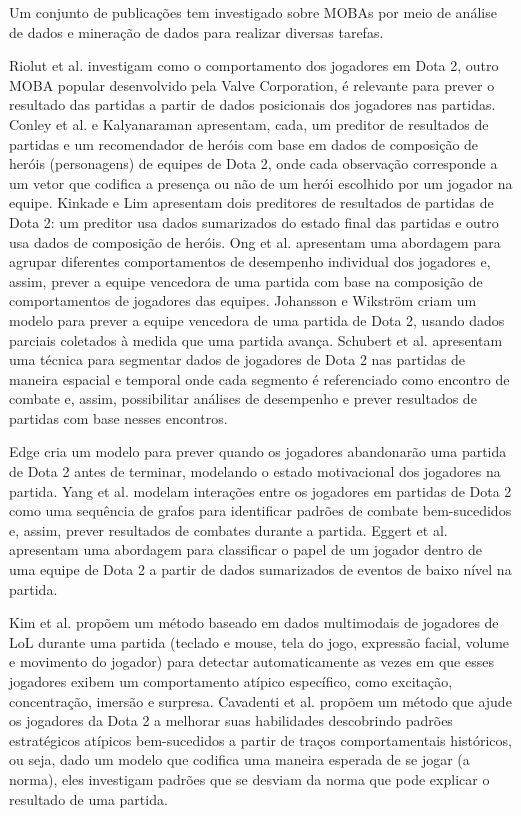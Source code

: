 Um conjunto de publicações tem investigado sobre MOBAs por meio de análise de dados e mineração de dados para realizar diversas tarefas.

Riolut et al. \cite{rioult2014mining} investigam como o comportamento dos jogadores em Dota 2, outro MOBA popular desenvolvido pela Valve Corporation, é relevante para prever o resultado das partidas a partir de dados posicionais dos jogadores nas partidas. Conley et al. \cite{conley2013does} e Kalyanaraman \cite{kalyanaraman2014win} apresentam, cada, um preditor de resultados de partidas e um recomendador de heróis com base em dados de composição de heróis (personagens) de equipes de Dota 2, onde cada observação corresponde a um vetor que codifica a presença ou não de um herói escolhido por um jogador na equipe. Kinkade e Lim \cite{kinkade2015dota} apresentam dois preditores de resultados de partidas de Dota 2: um preditor usa dados sumarizados do estado final das partidas e outro usa dados de composição de heróis. Ong et al. \cite{ong2015player} apresentam uma abordagem para agrupar diferentes comportamentos de desempenho individual dos jogadores e, assim, prever a equipe vencedora de uma partida com base na composição de comportamentos de jogadores das equipes. Johansson e Wikstr\"om \cite {johansson2015result} criam um modelo para prever a equipe vencedora de uma partida de Dota 2, usando dados parciais coletados à medida que uma partida avança. Schubert et al. \cite{schubert2016esports} apresentam uma técnica para segmentar dados de jogadores de Dota 2 nas partidas de maneira espacial e temporal onde cada segmento é referenciado como encontro de combate e, assim, possibilitar análises de desempenho e prever resultados de partidas com base nesses encontros.

Edge \cite{edge2013predicting} cria um modelo para prever quando os jogadores abandonarão uma partida de Dota 2 antes de terminar, modelando o estado motivacional dos jogadores na partida. Yang et al. \cite{yang2014identifying} modelam interações entre os jogadores em partidas de Dota 2 como uma sequência de grafos para identificar padrões de combate bem-sucedidos e, assim, prever resultados de combates durante a partida. Eggert et al. \cite{eggert2015classification} apresentam uma abordagem para classificar o papel de um jogador dentro de uma equipe de Dota 2 a partir de dados sumarizados de eventos de baixo nível na partida.

Kim et al. \cite{kim2015efficiently} propõem um método baseado em dados multimodais de jogadores de LoL durante uma partida (teclado e mouse, tela do jogo, expressão facial, volume e movimento do jogador) para detectar automaticamente as vezes em que esses jogadores exibem um comportamento atípico específico, como excitação, concentração, imersão e surpresa. Cavadenti et al. \cite{cavadenti2016did} propõem um método que ajude os jogadores da Dota 2 a melhorar suas habilidades descobrindo padrões estratégicos atípicos bem-sucedidos a partir de traços comportamentais históricos, ou seja, dado um modelo que codifica uma maneira esperada de se jogar (a norma), eles investigam padrões que se desviam da norma que pode explicar o resultado de uma partida.

